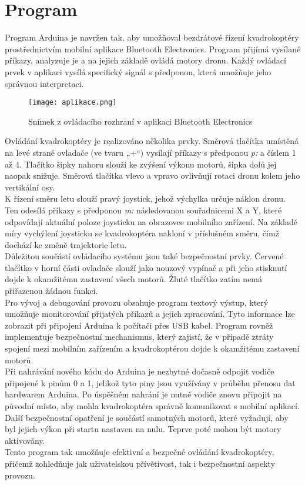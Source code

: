 \documentclass[12pt]{report}
\begin{document}
\chapter[Program]{Program}
Program Arduina je navržen tak, aby umožňoval bezdrátové řízení kvadrokoptéry prostřednictvím mobilní aplikace Bluetooth Electronics. Program přijímá vysílané příkazy, analyzuje je a na jejich základě ovládá motory dronu. Každý ovládací prvek v aplikaci vysílá specifický signál s předponou, která umožňuje jeho správnou interpretaci.\\
\begin{figure}[H]
	\centering
	\texttt{[image: aplikace.png]}
	\caption{Snímek z ovládacího rozhraní v aplikaci Bluetooth Electronics}
	\label{fig:aplikace.png}
\end{figure}
Ovládání kvadrokoptéry je realizováno několika prvky. Směrová tlačítka umístěná na levé straně ovladače (ve tvaru „+“) vysílají příkazy s předponou \textit{p:} a číslem 1 až 4. Tlačítko šipky nahoru slouží ke zvýšení výkonu motorů, šipka dolů jej naopak snižuje. Směrová tlačítka vlevo a vpravo ovlivňují rotaci dronu kolem jeho vertikální osy.\\
K řízení směru letu slouží pravý joystick, jehož výchylka určuje náklon dronu. Ten odesílá příkazy s předponou \textit{m:} následovanou souřadnicemi X a Y, které odpovídají aktuální poloze joysticku na obrazovce mobilního zařízení. Na základě míry vychýlení joysticku se kvadrokoptéra nakloní v příslušném směru, čímž dochází ke změně trajektorie letu.\\
Důležitou součástí ovládacího systému jsou také bezpečnostní prvky. Červené tlačítko v horní části ovladače slouží jako nouzový vypínač a při jeho stisknutí dojde k okamžitému zastavení všech motorů. Žluté tlačítko zatím nemá přiřazenou žádnou funkci.\\
Pro vývoj a debugování provozu obsahuje program textový výstup, který umožňuje monitorování přijatých příkazů a jejich zpracování. Tyto informace lze zobrazit při připojení Arduina k počítači přes USB kabel. Program rovněž implementuje bezpečnostní mechanismus, který zajistí, že v případě ztráty spojení mezi mobilním zařízením a kvadrokoptérou dojde k okamžitému zastavení motorů.\\
Při nahrávání nového kódu do Arduina je nezbytné dočasně odpojit vodiče připojené k pinům 0 a 1, jelikož tyto piny jsou využívány v průběhu přenosu dat hardwarem Arduina. Po úspěšném nahrání je nutné vodiče znovu připojit na původní místo, aby mohla kvadrokoptéra správně komunikovat s mobilní aplikací. Další bezpečnostní opatření je součástí samotných motorů, které vyžadují, aby byl jejich výkon při startu nastaven na nulu. Teprve poté mohou být motory aktivovány.\\
Tento program tak umožňuje efektivní a bezpečné ovládání kvadrokoptéry, přičemž zohledňuje jak uživatelskou přívětivost, tak i bezpečnostní aspekty provozu.
\end{document}
